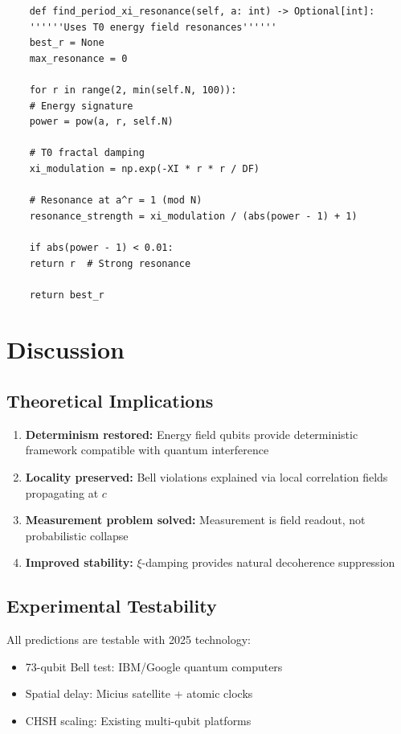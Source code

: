 \begin{lstlisting}
	def find_period_xi_resonance(self, a: int) -> Optional[int]:
	''''''Uses T0 energy field resonances''''''
	best_r = None
	max_resonance = 0
	
	for r in range(2, min(self.N, 100)):
	# Energy signature
	power = pow(a, r, self.N)
	
	# T0 fractal damping
	xi_modulation = np.exp(-XI * r * r / DF)
	
	# Resonance at a^r = 1 (mod N)
	resonance_strength = xi_modulation / (abs(power - 1) + 1)
	
	if abs(power - 1) < 0.01:
	return r  # Strong resonance
	
	return best_r
\end{lstlisting}

\section{Discussion}

\subsection{Theoretical Implications}

\begin{enumerate}
	\item \textbf{Determinism restored:} Energy field qubits provide deterministic framework compatible with quantum interference
	\item \textbf{Locality preserved:} Bell violations explained via local correlation fields propagating at $c$
	\item \textbf{Measurement problem solved:} Measurement is field readout, not probabilistic collapse
	\item \textbf{Improved stability:} $\xi$-damping provides natural decoherence suppression
\end{enumerate}

\subsection{Experimental Testability}

All predictions are testable with 2025 technology:
\begin{itemize}
	\item 73-qubit Bell test: IBM/Google quantum computers
	\item Spatial delay: Micius satellite + atomic clocks
	\item CHSH scaling: Existing multi-qubit platforms
\end{itemize}


